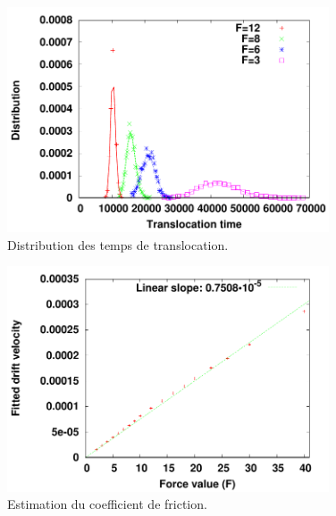 \begin{figure}[H]
\begin{center}
\includegraphics[width=0.85\textwidth]{distribpolsimple.pdf}


\caption[Distribution des temps de translocation du polymère simple]{Distribution des temps de translocation. }
\label{distribpolsimple}
\end{center}
\end{figure}


\begin{figure}[H]
\begin{center}
\includegraphics[width=0.85\textwidth]{translofrictioncoeffsimplepol.pdf}


\caption[Friction et translocation, polymère simple]{Estimation du coefficient de friction. }
\label{frictionpolsimple}
\end{center}
\end{figure}




 

